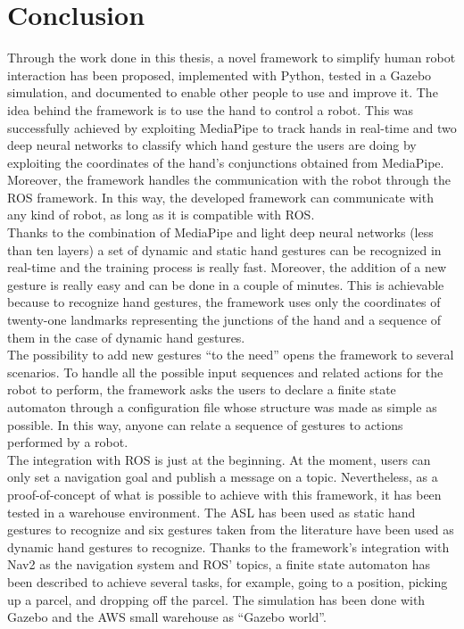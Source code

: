 \documentclass[../thesis.tex]{subfiles}
\begin{document}
\chapter{Conclusion}\label{cap:conclusion}
Through the work done in this thesis, a novel framework to simplify human robot interaction has been proposed, implemented with Python, tested in a Gazebo simulation, and documented to enable other people to use and improve it. The idea behind the framework is to use the hand to control a robot. This was successfully achieved by exploiting MediaPipe to track hands in real-time and two deep neural networks to classify which hand gesture the users are doing by exploiting the coordinates of the hand's conjunctions obtained from MediaPipe. Moreover, the framework handles the communication with the robot through the \gls{ROS} framework. In this way, the developed framework can communicate with any kind of robot, as long as it is compatible with \gls{ROS}.\\

Thanks to the combination of MediaPipe and light deep neural networks (less than ten layers) a set of dynamic and static hand gestures can be recognized in real-time and the training process is really fast. Moreover, the addition of a new gesture is really easy and can be done in a couple of minutes. This is achievable because to recognize hand gestures, the framework uses only the coordinates of twenty-one landmarks representing the junctions of the hand and a sequence of them in the case of dynamic hand gestures.\\

The possibility to add new gestures ``to the need'' opens the framework to several scenarios. To handle all the possible input sequences and related actions for the robot to perform, the framework asks the users to declare a finite state automaton through a configuration file whose structure was made as simple as possible. In this way, anyone can relate a sequence of gestures to actions performed by a robot.\\

The integration with \gls{ROS} is just at the beginning. At the moment, users can only set a navigation goal and publish a message on a topic. Nevertheless, as a proof-of-concept of what is possible to achieve with this framework, it has been tested in a warehouse environment. The \gls{ASL} has been used as static hand gestures to recognize and six gestures taken from the literature have been used as dynamic hand gestures to recognize. Thanks to the framework's integration with Nav2 as the navigation system and \gls{ROS}' topics, a finite state automaton has been described to achieve several tasks, for example, going to a position, picking up a parcel, and dropping off the parcel. The simulation has been done with Gazebo and the AWS small warehouse as ``Gazebo world''.\\
\end{document}
